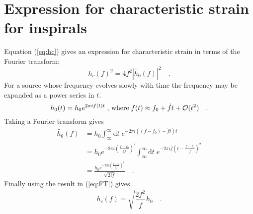 \documentclass[fleqn,12pt]{iopart}
\begin{document}
\section{Expression for characteristic strain for inspirals}
\label{app:b}
Equation (\ref{eq:hc}) gives an expression for characteristic strain in terms of the Fourier transform;
\begin{equation}\label{eq:FT} h_{c}(f)^{2}=4f^{2}\left| \tilde{h_{0}}(f) \right|^{2} \quad . \end{equation}
For a source whose frequency evolves slowly with time the frequency may be expanded as a power series in $t$.
\begin{equation}h_{0}(t)= h_{0}e^{2\pi i f(t)t} \; \textrm{, where} \; f(t) \approx f_{0}+\dot{f}t+{\cal{O}}(t^{2})\quad . \end{equation}
Taking a Fourier transform gives
\begin{eqnarray} 
\tilde{h_{0}}(f)&=h_{0}\int_{\infty}^{\infty}\textrm{d}t\; e^{-2\pi i \left( (f-f_{0})-\dot{f}t \right)t} \nonumber\\
&=h_{0}e^{-2\pi i \left( \frac{f-f_{0}}{2\dot{f}} \right)^{2}}\int_{\infty}^{\infty}\textrm{d}t\; 
	e^{-2\pi i \dot{f}\left( t-\frac{f-f_{0}}{\dot{f}} \right)^{2}} \nonumber\\
&=\frac{h_{0}e^{-2\pi i \left(\frac{f-f_{0}}{2\dot{f}}\right)^{2}}}{\sqrt{2 i \dot{f}}} \quad .
\end{eqnarray}
Finally using the result in (\ref{eq:FT}) gives
\begin{equation} h_{c}(f)=\sqrt{\frac{2f^{2}}{\dot{f}}}h_{0} \quad . \end{equation}
\end{document}

